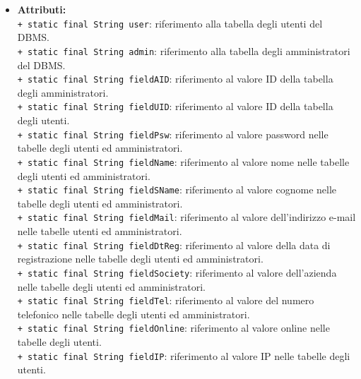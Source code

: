 {\begin{sloppypar}
{{{{\begin{itemize}
				\item[] \textbf{Attributi:}{\\
					\texttt{+ static final String user}: riferimento alla tabella degli utenti del DBMS\g.\\
					
					\texttt{+ static final String admin}: riferimento alla tabella degli amministratori del DBMS\g.\\
					
					\texttt{+ static final String fieldAID}: riferimento al valore ID della tabella degli amministratori.\\
					
					\texttt{+ static final String fieldUID}: riferimento al valore ID della tabella degli utenti.\\
					
					\texttt{+ static final String fieldPsw}: riferimento al valore password nelle tabelle degli utenti ed amministratori.\\
					
					\texttt{+ static final String fieldName}: riferimento al valore nome nelle tabelle degli utenti ed amministratori.\\
					
					\texttt{+ static final String fieldSName}: riferimento al valore cognome nelle tabelle degli  utenti ed amministratori.\\
					
					\texttt{+ static final String fieldMail}: riferimento al valore dell'indirizzo e-mail nelle tabelle utenti ed amministratori.\\
					
					\texttt{+ static final String fieldDtReg}: riferimento al valore della data di registrazione nelle tabelle degli utenti ed amministratori.\\
					
					\texttt{+ static final String fieldSociety}: riferimento al valore dell'azienda nelle tabelle degli utenti ed amministratori.\\
					
					\texttt{+ static final String fieldTel}: riferimento al valore del numero telefonico nelle tabelle degli utenti ed amministratori.\\
					
					\texttt{+ static final String fieldOnline}: riferimento al valore online nelle tabelle degli utenti.\\
					
					\texttt{+ static final String fieldIP}: riferimento al valore IP nelle tabelle degli utenti.\\
					
}
\end{itemize}}}}}
\end{sloppypar}}

